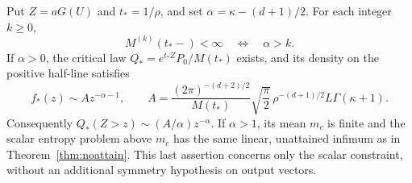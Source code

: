 \begin{theorem}
Put $Z=aG(U)$ and $t_*=1/\rho$, and set
$\alpha=\kappa-(d+1)/2$. For each integer $k\ge0$,
\[
        M^{(k)}(t_*-)<\infty\quad\Longleftrightarrow\quad\alpha>k.
 \tag{26}
\]
If $\alpha>0$, the critical law $Q_*=e^{t_*Z}P_0/M(t_*)$ exists,
and its density on the positive half-line satisfies
\[
 f_*(z)\sim A z^{-\alpha-1},\qquad
 A=\frac{(2\pi)^{-(d+2)/2}}{M(t_*)}
       \sqrt{\frac\pi2}\,
       \rho^{-(d+1)/2}L\Gamma(\kappa+1).
 \tag{27}
\]
Consequently $Q_*(Z>z)\sim (A/\alpha)z^{-\alpha}$.
If $\alpha>1$, its mean $m_c$ is finite and the scalar entropy
problem above $m_c$ has the same linear, unattained infimum as in
Theorem~\ref{thm:noattain}. This last assertion concerns only the scalar
constraint, without an additional symmetry hypothesis on output vectors.
\end{theorem}
